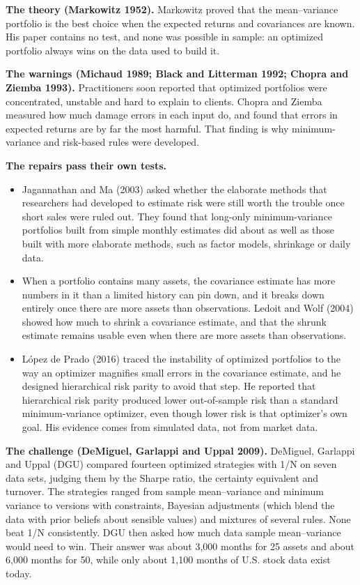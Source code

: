 \textbf{The theory (Markowitz 1952).} Markowitz proved that the mean--variance portfolio is the best choice when the expected returns and covariances are known. His paper contains no test, and none was possible in sample: an optimized portfolio always wins on the data used to build it.

\textbf{The warnings (Michaud 1989; Black and Litterman 1992; Chopra and Ziemba 1993).} Practitioners soon reported that optimized portfolios were concentrated, unstable and hard to explain to clients. Chopra and Ziemba measured how much damage errors in each input do, and found that errors in expected returns are by far the most harmful. That finding is why minimum-variance and risk-based rules were developed.

\textbf{The repairs pass their own tests.}

\begin{itemize}
  \item Jagannathan and Ma (2003) asked whether the elaborate methods that researchers had developed to estimate risk were still worth the trouble once short sales were ruled out. They found that long-only minimum-variance portfolios built from simple monthly estimates did about as well as those built with more elaborate methods, such as factor models, shrinkage or daily data.
  \item When a portfolio contains many assets, the covariance estimate has more numbers in it than a limited history can pin down, and it breaks down entirely once there are more assets than observations. Ledoit and Wolf (2004) showed how much to shrink a covariance estimate, and that the shrunk estimate remains usable even when there are more assets than observations.
  \item L\'opez de Prado (2016) traced the instability of optimized portfolios to the way an optimizer magnifies small errors in the covariance estimate, and he designed hierarchical risk parity to avoid that step. He reported that hierarchical risk parity produced lower out-of-sample risk than a standard minimum-variance optimizer, even though lower risk is that optimizer's own goal. His evidence comes from simulated data, not from market data.
\end{itemize}

\textbf{The challenge (DeMiguel, Garlappi and Uppal 2009).} DeMiguel, Garlappi and Uppal (DGU) compared fourteen optimized strategies with 1/N on seven data sets, judging them by the Sharpe ratio, the certainty equivalent and turnover. The strategies ranged from sample mean--variance and minimum variance to versions with constraints, Bayesian adjustments (which blend the data with prior beliefs about sensible values) and mixtures of several rules. None beat 1/N consistently. DGU then asked how much data sample mean--variance would need to win. Their answer was about 3,000 months for 25 assets and about 6,000 months for 50, while only about 1,100 months of U.S. stock data exist today.

